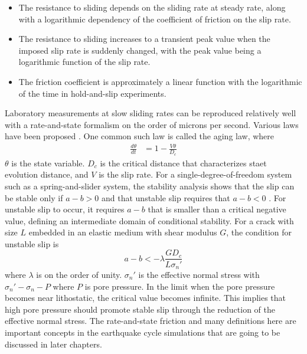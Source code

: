 \begin{itemize}
    \item The resistance to sliding depends on the sliding rate at steady rate, along with a logarithmic dependency of the coefficient of friction on the slip rate.
    \item The resistance to sliding increases to a transient peak value when the imposed slip rate is suddenly changed, with the peak value being a logarithmic function of the slip rate.
    \item The friction coefficient is approximately a linear function with the logarithmic of the time in hold-and-slip experiments.
\end{itemize}

Laboratory measurements at slow sliding rates can be reproduced relatively well with a rate-and-state formalism on the order of microns per second.
Various laws have been proposed \citep{https://doi.org/10.1029/JB084iB05p02161, https://doi.org/10.1029/JB084iB05p02169,https://doi.org/10.1029/JB088iB12p10359,annurev:/content/journals/10.1146/annurev.earth.26.1.643}.
One common such law is called the aging law, where
\begin{align}
    \frac{d\theta}{dt} &= 1 - \frac{V\theta}{D_c}
\end{align}
$\theta$ is the state variable. $D_c$ is the critical distance that characterizes staet evolution distance, and $V$ is the slip rate.
For a single-degree-of-freedom system such as a spring-and-slider system, the stability analysis shows that the slip can be stable only if $a - b > 0$ and that unstable slip requires that $a - b < 0$ \citep{scholz2019mechanics}.  
For unstable slip to occur, it requires $a - b$ that is smaller than a critical negative value, defining an intermediate domain of conditional stability.
For a crack with size $L$ embedded in an elastic medium with shear modulus $G$, the condition for unstable slip is 
\begin{equation}
    a - b < - \lambda \frac{GD_c}{L\sigma_n'}
\end{equation}
where $\lambda$ is on the order of unity. 
$\sigma_n'$ is the effective normal stress with $\sigma_n' - \sigma_n - P$ where $P$ is pore pressure\citep{scholz2019mechanics}.
In the limit when the pore pressure becomes near lithostatic, the critical value becomes infinite.
This implies that high pore pressure should promote stable slip through the reduction of the effective normal stress.
The rate-and-state friction and many definitions here are important concepts in the earthquake cycle simulations that are going to be discussed in later chapters.

